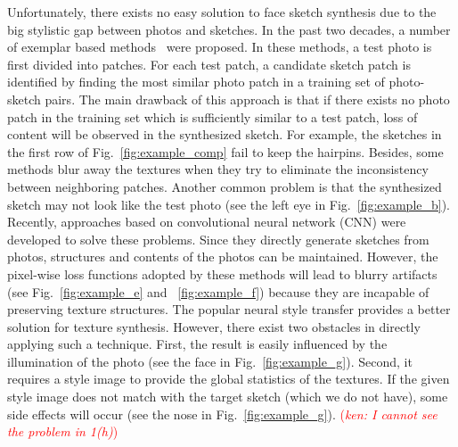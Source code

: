 \documentclass[10pt,twocolumn,letterpaper]{article}
\newcommand\ken[1]{{\small \textcolor{red}{(\emph{ken: #1})}}}
\begin{document}
Unfortunately, there exists no easy solution to face sketch synthesis due to the big stylistic gap between photos and sketches. In the past two decades, a number of exemplar based methods~\cite{wang2009face,song2014real, zhang2010lighting,zhou2012markov} were proposed. In these methods, a test photo is first divided into patches. For each test patch, a candidate sketch patch is identified by finding the most similar photo patch in a training set of photo-sketch pairs. The main drawback of this approach is that if there exists no photo patch in the training set which is  sufficiently similar to a test patch, loss of content will be observed in the synthesized sketch. For example, the sketches in the first row of Fig.~\ref{fig:example_comp} fail to keep the hairpins. Besides, some methods \cite{song2014real,zhou2012markov} blur away the textures when they try to eliminate the inconsistency between neighboring patches. Another common problem is that the synthesized sketch may not look like the test photo (see the left eye in Fig.~\ref{fig:example_b}). Recently, approaches \cite{zhang2017content,zhang2015end} based on convolutional neural network (CNN) were developed to solve these problems. Since they directly generate sketches from photos, structures and contents of the photos can be maintained. However, the pixel-wise loss functions adopted by these methods will lead to blurry artifacts (see Fig.~\ref{fig:example_e} and ~\ref{fig:example_f}) because they are incapable of preserving texture structures. The popular neural style transfer provides a better solution for texture synthesis. However, there exist two obstacles in directly applying such a technique. First, the result is easily influenced by the illumination of the photo (see the face in Fig.~\ref{fig:example_g}). Second, it requires a style image to provide the global statistics of the textures. If the given style image does not match with the target sketch (which we do not have), some side effects will occur (see the nose in Fig.~\ref{fig:example_g}). \ken{I cannot see the problem in 1(h)} %
\end{document}
